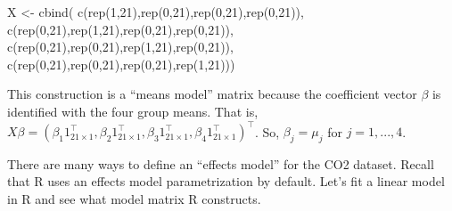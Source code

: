 \documentclass[
]{book}
\newenvironment{Shaded}{\begin{snugshade}}{\end{snugshade}}
\newcommand{\AttributeTok}[1]{\textcolor[rgb]{0.77,0.63,0.00}{#1}}
\newcommand{\DecValTok}[1]{\textcolor[rgb]{0.00,0.00,0.81}{#1}}
\newcommand{\FunctionTok}[1]{\textcolor[rgb]{0.00,0.00,0.00}{#1}}
\newcommand{\NormalTok}[1]{#1}
\newcommand{\OtherTok}[1]{\textcolor[rgb]{0.56,0.35,0.01}{#1}}
\newcommand{\SpecialCharTok}[1]{\textcolor[rgb]{0.00,0.00,0.00}{#1}}
\begin{document}
\begin{Shaded}
\begin{Highlighting}[]
\NormalTok{X }\OtherTok{\textless{}{-}} \FunctionTok{cbind}\NormalTok{(  }\FunctionTok{c}\NormalTok{(}\FunctionTok{rep}\NormalTok{(}\DecValTok{1}\NormalTok{,}\DecValTok{21}\NormalTok{),}\FunctionTok{rep}\NormalTok{(}\DecValTok{0}\NormalTok{,}\DecValTok{21}\NormalTok{),}\FunctionTok{rep}\NormalTok{(}\DecValTok{0}\NormalTok{,}\DecValTok{21}\NormalTok{),}\FunctionTok{rep}\NormalTok{(}\DecValTok{0}\NormalTok{,}\DecValTok{21}\NormalTok{)),}
             \FunctionTok{c}\NormalTok{(}\FunctionTok{rep}\NormalTok{(}\DecValTok{0}\NormalTok{,}\DecValTok{21}\NormalTok{),}\FunctionTok{rep}\NormalTok{(}\DecValTok{1}\NormalTok{,}\DecValTok{21}\NormalTok{),}\FunctionTok{rep}\NormalTok{(}\DecValTok{0}\NormalTok{,}\DecValTok{21}\NormalTok{),}\FunctionTok{rep}\NormalTok{(}\DecValTok{0}\NormalTok{,}\DecValTok{21}\NormalTok{)),}
             \FunctionTok{c}\NormalTok{(}\FunctionTok{rep}\NormalTok{(}\DecValTok{0}\NormalTok{,}\DecValTok{21}\NormalTok{),}\FunctionTok{rep}\NormalTok{(}\DecValTok{0}\NormalTok{,}\DecValTok{21}\NormalTok{),}\FunctionTok{rep}\NormalTok{(}\DecValTok{1}\NormalTok{,}\DecValTok{21}\NormalTok{),}\FunctionTok{rep}\NormalTok{(}\DecValTok{0}\NormalTok{,}\DecValTok{21}\NormalTok{)),}
             \FunctionTok{c}\NormalTok{(}\FunctionTok{rep}\NormalTok{(}\DecValTok{0}\NormalTok{,}\DecValTok{21}\NormalTok{),}\FunctionTok{rep}\NormalTok{(}\DecValTok{0}\NormalTok{,}\DecValTok{21}\NormalTok{),}\FunctionTok{rep}\NormalTok{(}\DecValTok{0}\NormalTok{,}\DecValTok{21}\NormalTok{),}\FunctionTok{rep}\NormalTok{(}\DecValTok{1}\NormalTok{,}\DecValTok{21}\NormalTok{)))}
\end{Highlighting}
\end{Shaded}

This construction is a ``means model'' matrix because the coefficient vector \(\beta\) is identified with the four group means. That is, \(X\beta = (\beta_1 1_{21\times1}^\top, \beta_2 1_{21\times1}^\top, \beta_3 1_{21\times1}^\top, \beta_4 1_{21\times1}^\top)^\top\). So, \(\beta_j = \mu_j\) for \(j=1,...,4\).

There are many ways to define an ``effects model'' for the CO2 dataset. Recall that R uses an effects model parametrization by default. Let's fit a linear model in R and see what model matrix R constructs.

\begin{Shaded}
\end{Shaded}
\end{document}

